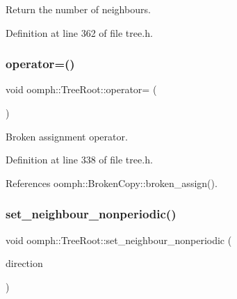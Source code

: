 Return the number of neighbours. 



Definition at line 362 of file tree.\+h.

\mbox{\label{classoomph_1_1TreeRoot_a1a600f35a0134eafe193d0996b2c7cd3}} 
\subsubsection{\texorpdfstring{operator=()}{operator=()}}
{\footnotesize\ttfamily void oomph\+::\+Tree\+Root\+::operator= (\begin{DoxyParamCaption}\item[{const \hyperlink{classoomph_1_1TreeRoot}{Tree\+Root} \&}]{ }\end{DoxyParamCaption})\hspace{0.3cm}{\ttfamily [inline]}}



Broken assignment operator. 



Definition at line 338 of file tree.\+h.



References oomph\+::\+Broken\+Copy\+::broken\+\_\+assign().

\mbox{\label{classoomph_1_1TreeRoot_a9e20f4787d7b34d5f4462dea63fd0204}} 
\subsubsection{\texorpdfstring{set\+\_\+neighbour\+\_\+nonperiodic()}{set\_neighbour\_nonperiodic()}}
{\footnotesize\ttfamily void oomph\+::\+Tree\+Root\+::set\+\_\+neighbour\+\_\+nonperiodic (\begin{DoxyParamCaption}\item[{const int \&}]{direction }\end{DoxyParamCaption})\hspace{0.3cm}{\ttfamily [inline]}}



